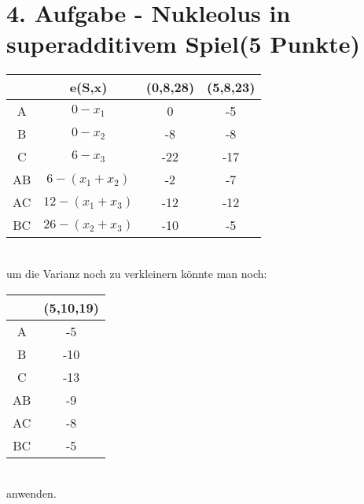 \documentclass[a4paper, 11pt]{article}
\begin{document}
\section*{4. Aufgabe - Nukleolus in superadditivem Spiel\hfill {\small (5 Punkte)}}
\begin{tabular}{c || c c c}
& e(S,x) & (0,8,28) & (5,8,23) \\ \hline
A & $0-x_1$ & 0 & -5\\
B & $0-x_2$ & -8 & -8\\
C & $6-x_3$ & -22 & -17\\
AB & $6-(x_1+x_2)$ & -2 & -7\\
AC & $12-(x_1+x_3)$ & -12 & -12\\
BC & $26-(x_2+x_3)$ & -10 & -5\\

\end{tabular}\\
um die Varianz noch zu verkleinern könnte man noch:

\begin{tabular}{c || c}
& (5,10,19) \\ \hline
A &-5\\
B & -10\\
C & -13\\
AB & -9\\
AC & -8\\
BC & -5\\

\end{tabular}\\
anwenden.

\end{document}
